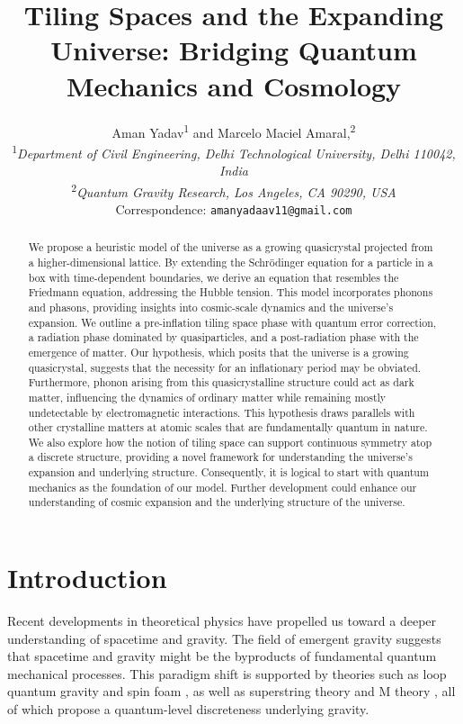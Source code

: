 \documentclass{article}
\title{Tiling Spaces and the Expanding Universe: Bridging Quantum Mechanics and Cosmology}
\author{Aman Yadav\textsuperscript{1} and Marcelo Maciel Amaral,\textsuperscript{2}\\
  \textsuperscript{1}\emph{Department of Civil Engineering, Delhi
Technological University, Delhi 110042, India}\\
\textsuperscript{2}\emph{Quantum Gravity Research, Los Angeles, CA 90290, USA}\\
Correspondence: \texttt{amanyadaav11@gmail.com}\\
}
\begin{document}
\maketitle


\begin{abstract}
We propose a heuristic model of the universe as a growing quasicrystal projected from a higher-dimensional lattice. By extending the Schr{\"o}dinger equation for a particle in a box with time-dependent boundaries, we derive an equation that resembles the Friedmann equation, addressing the Hubble tension. This model incorporates phonons and phasons, providing insights into cosmic-scale dynamics and the universe’s expansion. We outline a pre-inflation tiling space phase with quantum error correction, a radiation phase dominated by quasiparticles, and a post-radiation phase with the emergence of matter. Our hypothesis, which posits that the universe is a growing quasicrystal, suggests that the necessity for an inflationary period may be obviated. Furthermore, phonon arising from this quasicrystalline structure could act as dark matter, influencing the dynamics of ordinary matter while remaining mostly undetectable by electromagnetic interactions. This hypothesis draws parallels with other crystalline matters at atomic scales that are fundamentally quantum in nature. We also explore how the notion of tiling space can support continuous symmetry atop a discrete structure, providing a novel framework for understanding the universe’s expansion and underlying structure. Consequently, it is logical to start with quantum mechanics as the foundation of our model. Further development could enhance our understanding of cosmic expansion and the underlying structure of the universe.
\end{abstract}





\tableofcontents

\section{Introduction}
\label{intro}

Recent developments in theoretical physics have propelled us toward a deeper understanding of spacetime and gravity. The field of emergent gravity \cite{Verlinde2011} suggests that spacetime and gravity might be the byproducts of fundamental quantum mechanical processes. This paradigm shift is supported by theories such as loop quantum gravity and spin foam \cite{Rovelli-Vidotto-Book}, as well as superstring theory and M theory \cite{stringbook1}, all of which propose a quantum-level discreteness underlying gravity.
\end{document}
